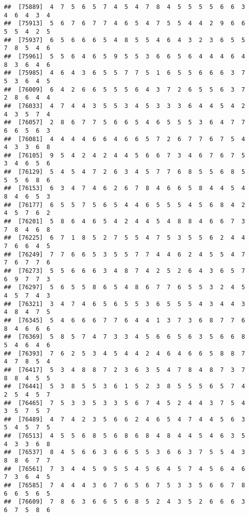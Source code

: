 \documentclass[
]{book}
\begin{document}
\begin{verbatim}
##  [75889]  4  7  5  6  5  7  4  5  4  7  8  4  5  5  5  5  6  6  3  4  6  4  3  4
##  [75913]  5  6  7  6  7  7  4  6  5  4  7  5  5  4  4  2  9  6  6  5  5  4  2  5
##  [75937]  6  5  6  6  6  5  4  8  5  5  4  6  4  3  2  3  6  5  5  7  8  5  4  6
##  [75961]  5  5  6  4  6  5  9  5  5  3  6  6  5  6  4  4  4  6  4  8  3  6  4  6
##  [75985]  4  6  4  3  6  5  5  7  7  5  1  6  5  5  6  6  6  3  7  5  3  6  4  5
##  [76009]  6  4  2  6  6  5  5  5  6  4  3  7  2  6  5  5  6  3  7  2  8  6  4  4
##  [76033]  4  7  4  4  3  5  5  3  4  5  3  3  3  6  4  4  5  4  2  4  3  5  7  4
##  [76057]  2  8  6  7  7  5  6  6  5  4  6  5  5  5  3  6  4  7  7  6  6  5  6  3
##  [76081]  4  4  4  4  6  6  4  6  6  5  7  2  6  7  7  6  7  5  4  4  3  3  6  8
##  [76105]  9  5  4  2  4  2  4  4  5  6  6  7  3  4  6  7  6  7  5  3  4  6  5  6
##  [76129]  5  4  5  4  7  2  6  3  4  5  7  7  6  8  5  5  6  8  5  5  5  6  8  6
##  [76153]  6  3  4  7  4  6  2  6  7  8  4  6  6  5  8  4  4  5  4  8  4  6  5  3
##  [76177]  6  5  5  7  5  6  5  4  4  6  5  5  5  4  5  6  8  4  2  4  5  7  6  2
##  [76201]  5  8  6  4  6  5  4  2  4  4  5  4  8  8  4  6  6  7  3  7  8  4  6  8
##  [76225]  6  7  1  8  5  2  7  5  5  4  7  5  3  5  5  6  2  4  4  7  6  6  4  5
##  [76249]  7  7  6  6  5  3  5  5  7  7  4  4  6  2  4  5  5  4  7  7  6  7  7  6
##  [76273]  5  5  6  6  6  3  4  8  7  4  2  5  2  6  4  3  6  5  7  6  9  7  7  3
##  [76297]  5  6  5  5  8  6  5  4  8  6  7  7  6  5  5  3  2  4  5  4  5  7  4  3
##  [76321]  3  4  7  4  6  5  6  5  5  3  6  5  5  5  4  3  4  4  3  4  8  4  7  5
##  [76345]  5  4  6  6  6  7  7  6  4  4  1  3  7  3  6  8  7  7  6  8  4  6  6  6
##  [76369]  5  8  5  7  4  7  3  3  4  5  6  6  5  6  3  5  6  6  8  5  4  6  4  6
##  [76393]  7  6  2  5  3  4  5  4  4  2  4  6  4  6  6  5  8  8  7  4  7  8  5  4
##  [76417]  5  3  4  8  8  7  2  3  6  3  5  4  7  8  4  8  7  3  7  8  8  4  5  5
##  [76441]  5  3  8  5  5  3  6  1  5  2  3  8  5  5  5  6  5  7  4  2  5  4  5  7
##  [76465]  7  5  3  3  5  3  3  5  6  7  4  5  2  4  4  3  7  5  4  3  5  7  5  7
##  [76489]  4  7  4  2  3  5  6  6  2  4  6  5  4  7  4  4  5  6  3  5  4  5  7  5
##  [76513]  4  5  5  6  8  5  6  8  6  8  4  8  4  4  5  4  6  3  5  4  3  3  6  8
##  [76537]  8  4  5  6  6  3  6  6  5  5  3  6  6  3  7  5  5  4  3  8  8  6  7  7
##  [76561]  7  3  4  4  5  9  5  5  4  5  6  4  5  7  4  5  6  4  6  7  3  6  4  5
##  [76585]  7  4  4  4  3  6  7  6  5  6  7  5  3  3  5  6  6  7  8  6  6  5  6  5
##  [76609]  7  8  6  3  6  6  5  6  8  5  2  4  3  5  2  6  6  6  3  6  7  5  8  6

\end{verbatim}
\end{document}
